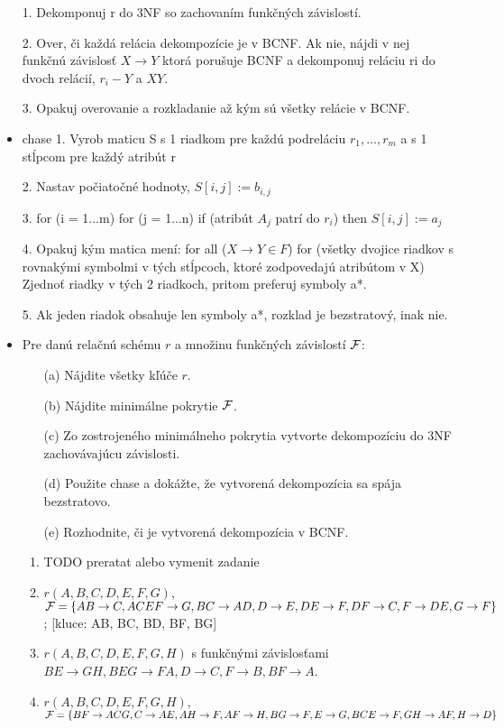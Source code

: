 \documentclass[10pt, a4paper]{article}
\begin{document}
\begin{itemize}
1. Dekomponuj r do 3NF so zachovaním funkčných závislostí.

2. Over, či každá relácia dekompozície je v BCNF. Ak nie, nájdi v
nej funkčnú závislosť $X\to Y$ ktorá porušuje BCNF a
dekomponuj reláciu ri do dvoch relácií, $r_i - Y$ a $XY$.

3. Opakuj overovanie a rozkladanie až kým sú všetky relácie v
BCNF.

\item chase
1. Vyrob maticu S s 1 riadkom pre každú podreláciu $r_1, \dots, r_m$
a s 1 stĺpcom pre každý atribút r

2. Nastav počiatočné hodnoty, $S[i, j] := b_{i,j}$

3. for (i = 1...m)
for (j = 1...n)
if (atribút $A_j$ patrí do $r_i$) then $S[i, j] := a_j$

4. Opakuj kým matica mení:
for all ($X\to Y \in F$)
for (všetky dvojice riadkov s rovnakými symbolmi v tých stĺpcoch, ktoré
zodpovedajú atribútom v X)
Zjednoť riadky v tých 2 riadkoch, pritom preferuj symboly a*.

5. Ak jeden riadok obsahuje len symboly a*, rozklad je bezstratový, inak nie.


\item
Pre danú relačnú schému $r$ a množinu funkčných závislostí ${\cal F}$:
\begin{itemize}
    \item[(a)] Nájdite všetky kľúče $r$.
    \item[(b)] Nájdite minimálne pokrytie ${\cal F}$.
    \item[(c)] Zo zostrojeného minimálneho pokrytia vytvorte dekompozíciu do 3NF zachovávajúcu závislosti.
    \item[(d)] Použite chase a dokážte, že vytvorená dekompozícia sa spája bezstratovo.
    \item[(e)] Rozhodnite, či je vytvorená dekompozícia v BCNF.
\end{itemize}
\begin{enumerate}
    \item TODO preratat alebo vymenit zadanie
    \item $r(A, B, C, D, E, F, G)$, ${\cal F}=\{AB\to C, ACEF\to G, BC\to AD, D\to E, DE\to F, DF\to C, F\to DE, G\to F\}$; [kluce: AB, BC, BD, BF, BG]
    \item $r(A, B, C, D, E, F, G, H)$ s funkčnými závislosťami $BE\to GH, BEG\to FA, D\to C, F\to B, BF\to A$.
    \item $r(A, B, C, D, E, F, G, H)$, ${\cal F}=\{BF\to ACG, C\to AE, AH\to F, AF\to H, BG\to F, E\to G, BCE\to F, GH\to AF, H\to D\}$
\end{enumerate}


\end{itemize}
\end{document}
